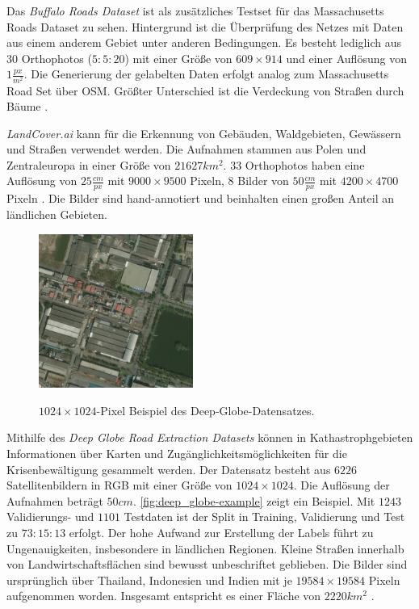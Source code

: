 Das \textit{Buffalo Roads Dataset} ist als zusätzliches Testset für das Massachusetts Roads Dataset zu sehen.
Hintergrund ist die Überprüfung des Netzes mit Daten aus einem anderem Gebiet unter anderen Bedingungen.
Es besteht lediglich aus 30 Orthophotos ($5:5:20$) mit einer Größe von $609\times 914$ und einer Auflösung von $1 \frac{px}{m^2}$.
Die Generierung der gelabelten Daten erfolgt analog zum Massachusetts Road Set über \ac{OSM}.
Größter Unterschied ist die Verdeckung von Straßen durch Bäume \cite[86-88]{.06.04.2014}.

\textit{LandCover.ai} kann für die Erkennung von Gebäuden, Waldgebieten, Gewässern und Straßen verwendet werden.
Die Aufnahmen stammen aus Polen und Zentraleuropa in einer Größe von $21627 km^2$.
$33$ Orthophotos haben eine Auflösung von $25 \frac{cm}{px}$ mit $9000\times 9500$ Pixeln, $8$ Bilder von $50 \frac{cm}{px}$ mit $4200 \times 4700$ Pixeln \cite{.20.04.2022}.
Die Bilder sind hand-annotiert und beinhalten einen großen Anteil an ländlichen Gebieten.

\begin{figure}
	\centering
	\vspace{-20pt} %
	\includegraphics[width=0.45\textwidth]{Bilder/deep_globe_example.jpg}
	\vspace{-5pt}
	\caption[$1024\times 1024$-Pixel Beispiel des Deep-Globe-Datensatzes.]{\unskip}
	$1024\times 1024$-Pixel Beispiel des Deep-Globe-Datensatzes.
	\label{fig:deep_globe-example}
\end{figure}

Mithilfe des \textit{Deep Globe Road Extraction Datasets} können in Kathastrophgebieten Informationen über Karten und Zugänglichkeitsmöglichkeiten für die Krisenbewältigung gesammelt werden.
Der Datensatz besteht aus $6226$ Satellitenbildern in RGB mit einer Größe von $1024\times 1024$.
Die Auflösung der Aufnahmen beträgt $50 cm$. \autoref{fig:deep_globe-example} zeigt ein Beispiel.
Mit $1243$ Validierungs- und $1101$ Testdaten ist der Split in Training, Validierung und Test zu $73:15:13$ erfolgt.
Der hohe Aufwand zur Erstellung der Labels führt zu Ungenauigkeiten, insbesondere in ländlichen Regionen. 
Kleine Straßen innerhalb von Landwirtschaftsflächen sind bewusst unbeschriftet geblieben.
Die Bilder sind ursprünglich über Thailand, Indonesien und Indien mit je $19584\times 19584$ Pixeln aufgenommen worden.
Insgesamt entspricht es einer Fläche von $2220 km^2$ \cite{Ashwath.10.11.2020}.


